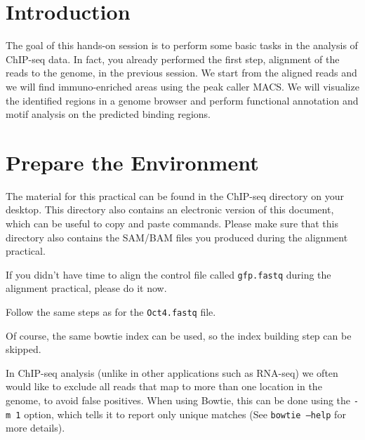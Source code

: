 \newpage

\section{Introduction}

\begin{information}
The goal of this hands-on session is to perform some basic tasks in the analysis
of ChIP-seq data. In fact, you already performed the first step, alignment of
the reads to the genome, in the previous session. We start from the aligned
reads and we will find immuno-enriched areas using the peak caller MACS. We will
visualize the identified regions in a genome browser and perform functional
annotation and motif analysis on the predicted binding regions.
\end{information}

\section{Prepare the Environment}

\begin{information}
The material for this practical can be found in the ChIP-seq directory on your
desktop. This directory also contains an electronic version of this document,
which can be useful to copy and paste commands. Please make sure that this
directory also contains the SAM/BAM files you produced during the alignment
practical.
\end{information}

\begin{steps}
If you didn't have time to align the control file called \texttt{gfp.fastq} during the
alignment practical, please do it now.

Follow the same steps as for the \texttt{Oct4.fastq} file.

\begin{information}
Of course, the same bowtie index can be used, so the index building step can be
skipped.
\end{information}
\end{steps}

\begin{note}
In ChIP-seq analysis (unlike in other applications such as RNA-seq) we often
would like to exclude all reads that map to more than one location in the
genome, to avoid false positives. When using Bowtie, this can be done using the
\texttt{-m 1} option, which tells it to report only unique matches (See
\texttt{bowtie --help} for more details).
\end{note}


